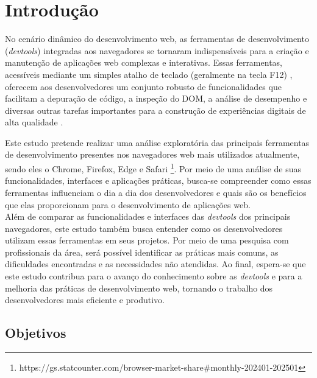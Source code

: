 
\chapter{Introdução}
\label{cap:introducao}

No cenário dinâmico do desenvolvimento web, as ferramentas de desenvolvimento (\textit{devtools}) integradas aos navegadores se tornaram indispensáveis para a criação e manutenção de aplicações web complexas e interativas. Essas ferramentas, acessíveis mediante um simples atalho de teclado (geralmente na tecla F12) \cite{firefox}, oferecem aos desenvolvedores um conjunto robusto de funcionalidades que facilitam a depuração de código, a inspeção do DOM, a análise de desempenho e diversas outras tarefas importantes para a construção de experiências digitais de alta qualidade \cite{chrome}.

Este estudo pretende realizar uma análise exploratória das principais ferramentas de desenvolvimento presentes nos navegadores web mais utilizados atualmente, sendo eles o Chrome, Firefox, Edge e Safari \footnote{https://gs.statcounter.com/browser-market-share#monthly-202401-202501}. Por meio de uma análise de suas funcionalidades, interfaces e aplicações práticas, busca-se compreender como essas ferramentas influenciam o dia a dia dos desenvolvedores e quais são os benefícios que elas proporcionam para o desenvolvimento de aplicações web.\\

Além de comparar as funcionalidades e interfaces das \textit{devtools} dos principais navegadores, este estudo também busca entender como os desenvolvedores utilizam essas ferramentas em seus projetos. Por meio de uma pesquisa com profissionais da área, será possível identificar as práticas mais comuns, as dificuldades encontradas e as necessidades não atendidas. Ao final, espera-se que este estudo contribua para o avanço do conhecimento sobre as \textit{devtools} e para a melhoria das práticas de desenvolvimento web, tornando o trabalho dos desenvolvedores mais eficiente e produtivo.


\section{Objetivos}
\label{sec:objetivos}

